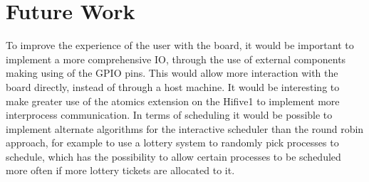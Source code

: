 \section{Future Work}
To improve the experience of the user with the board, it would be important to implement a more comprehensive IO, through the use of external components making using of the GPIO pins. This would allow more interaction with the board directly, instead of through a host machine. It would be interesting to make greater use of the atomics extension on the Hifive1 to implement more interprocess communication. In terms of scheduling it would be possible to implement alternate algorithms for the interactive scheduler than the round robin approach, for example to use a lottery system to randomly pick processes to schedule, which has the possibility to allow certain processes to be scheduled more often if more lottery tickets are allocated to it.
